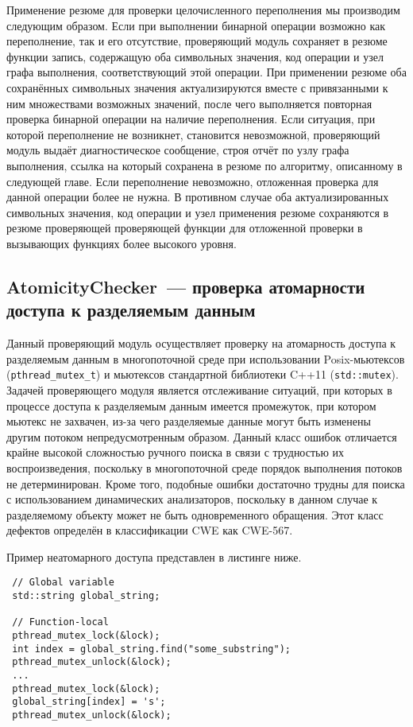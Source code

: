 Применение резюме для проверки целочисленного переполнения мы производим следующим образом. Если при выполнении бинарной операции возможно как переполнение, так и его отсутствие, проверяющий модуль сохраняет в резюме функции запись, содержащую оба символьных значения, код операции и узел графа выполнения, соответствующий этой операции. При применении резюме оба сохранённых символьных значения актуализируются вместе с привязанными к ним множествами возможных значений, после чего выполняется повторная проверка бинарной операции на наличие переполнения. Если ситуация, при которой переполнение не возникнет, становится невозможной, проверяющий модуль выдаёт диагностическое сообщение, строя отчёт по узлу графа выполнения, ссылка на который сохранена в резюме по алгоритму, описанному в следующей главе. Если переполнение невозможно, отложенная проверка для данной операции более не нужна. В противном случае оба актуализированных символьных значения, код операции и узел применения резюме сохраняются в резюме проверяющей проверяющей функции для отложенной проверки в вызывающих функциях более высокого уровня.

\subsection{AtomicityChecker~--- проверка атомарности доступа к разделяемым данным} \label{sect:atomicity}

Данный проверяющий модуль осуществляет проверку на атомарность доступа к разделяемым данным в многопоточной среде при использовании Posix-мьютексов (\texttt{pthread\_mutex\_t}) и мьютексов стандартной библиотеки C++11 (\texttt{std::mutex}). Задачей проверяющего модуля является отслеживание ситуаций, при которых в процессе доступа к разделяемым данным имеется промежуток, при котором мьютекс не захвачен, из-за чего разделяемые данные могут быть изменены другим потоком непредусмотренным образом. Данный класс ошибок отличается крайне высокой сложностью ручного поиска в связи с трудностью их воспроизведения, поскольку в многопоточной среде порядок выполнения потоков не детерминирован. Кроме того, подобные ошибки достаточно трудны для поиска с использованием динамических анализаторов, поскольку в данном случае к разделяемому объекту может не быть одновременного обращения. Этот класс дефектов определён в классификации CWE как CWE-567.

Пример неатомарного доступа представлен в листинге ниже.

\begin{verbatim}
 // Global variable
 std::string global_string;
 
 // Function-local
 pthread_mutex_lock(&lock);
 int index = global_string.find("some_substring");
 pthread_mutex_unlock(&lock);
 ...
 pthread_mutex_lock(&lock);
 global_string[index] = 's';
 pthread_mutex_unlock(&lock);
\end{verbatim}

